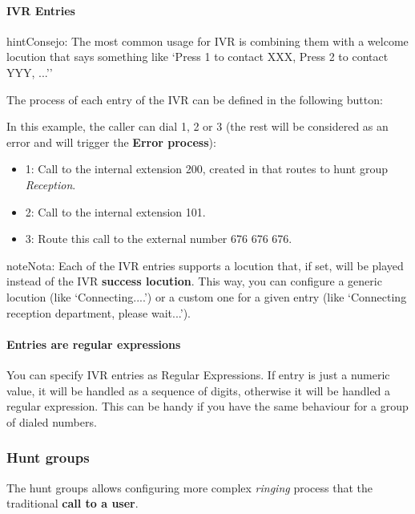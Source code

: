 \documentclass[letterpaper,10pt,spanish]{sphinxmanual}
\begin{document}
\paragraph{IVR Entries}
\label{administration_portal/client/vpbx/routing_endpoints/ivrs:ivr-entries}
\begin{notice}{hint}{Consejo:}
The most common usage for IVR is combining them with a welcome
locution that says something like `Press 1 to contact XXX, Press 2 to
contact YYY, ...''
\end{notice}

The process of each entry of the IVR can be defined in the following button:

In this example, the caller can dial 1, 2 or 3 (the rest will be considered as
an error and will trigger the \textbf{Error process}):
\begin{itemize}
\item {} 
1: Call to the internal extension 200, created in {\hyperref[administration_portal/client/vpbx/routing_endpoints/hunt_groups:huntgroups]{}} that routes to hunt group \emph{Reception}.

\item {} 
2: Call to the internal extension 101.

\item {} 
3: Route this call to the external number 676 676 676.

\end{itemize}

\begin{notice}{note}{Nota:}
Each of the IVR entries supports a locution that, if set,
will be played instead of the IVR \textbf{success locution}. This way, you can
configure a generic locution (like `Connecting....') or a custom one for
a given entry (like `Connecting reception department, please wait...').
\end{notice}
\paragraph{Entries are regular expressions}

You can specify IVR entries as Regular Expressions. If entry is just
a numeric value, it will be handled as a sequence of digits, otherwise it
will be handled a regular expression. This can be handy if you have the
same behaviour for a group of dialed numbers.


\subsubsection{Hunt groups}
\label{administration_portal/client/vpbx/routing_endpoints/hunt_groups:hunt-groups}\label{administration_portal/client/vpbx/routing_endpoints/hunt_groups::doc}\label{administration_portal/client/vpbx/routing_endpoints/hunt_groups:huntgroups}
The hunt groups allows configuring more complex \emph{ringing} process that the
traditional \textbf{call to a user}.
\end{document}

